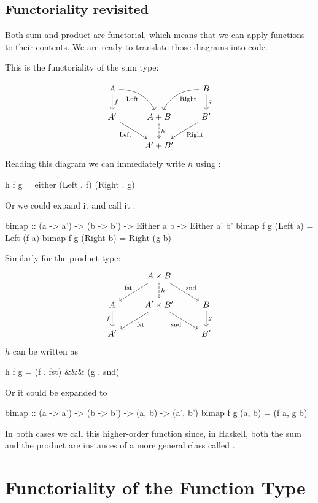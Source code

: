 \documentclass[DaoFP]{subfiles}
\begin{document}
\subsection{Functoriality revisited}

Both sum and product are functorial, which means that we can apply functions to their contents. We are ready to translate those diagrams into code. 

This is the functoriality of the sum type:

\[
 \begin{tikzcd}
 A
 \arrow[d, "f"]
 \arrow[dr,  bend left, "\text{Left}"']
  && B
 \arrow[d, "g"]
 \arrow[dl, bend right, "\text{Right}"]
 \\
 A'
 \arrow[rd, "\text{Left}"']
&A + B
\arrow[d, dashed, "h"]
& B'
\arrow[ld, "\text{Right}"]
\\
& A' + B'
 \end{tikzcd}
\]
Reading this diagram we can immediately write $h$ using :
\begin{haskell}
h f g = either (Left . f) (Right . g)
\end{haskell}
Or we could expand it and call it :
\begin{haskell}
bimap :: (a -> a') -> (b -> b') -> Either a b -> Either a' b'
bimap f g (Left  a) = Left  (f a)
bimap f g (Right b) = Right (g b)
\end{haskell}
Similarly for the product type:
\[
 \begin{tikzcd}
 & A \times B
\arrow[d, dashed, "h"]
 \arrow[dl,  "\text{fst}"']
 \arrow[dr,   "\text{snd}"]
\\
A
\arrow[d, "f"']
&A' \times B'
 \arrow[dl,  "\text{fst}"]
  \arrow[dr,   "\text{snd}"']
& B
\arrow[d, "g"]
\\
A' && B'
 \end{tikzcd}
\]
$h$ can be written as
\begin{haskell}
h f g = (f . fst) &&& (g . snd)
\end{haskell}
Or it could be expanded to
\begin{haskell}
bimap :: (a -> a') -> (b -> b') -> (a, b) -> (a', b')
bimap f g (a, b) = (f a, g b)
\end{haskell}
In both cases we call this higher-order function  since, in Haskell, both the sum and the product are instances of a more general class called .

\section{Functoriality of the Function Type}
\end{document}
